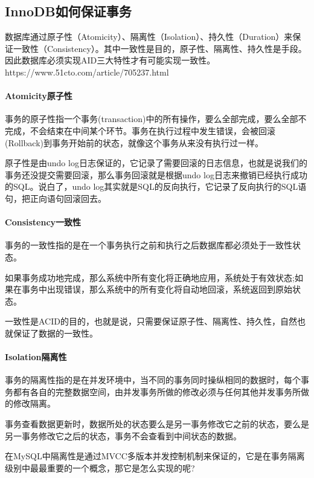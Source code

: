 \documentclass[../../../interview-questions.tex]{subfiles}
\begin{document}
\subsection{InnoDB如何保证事务}

数据库通过原子性（Atomicity）、隔离性（Isolation）、持久性（Duration）来保证一致性（Consistency）。其中一致性是目的，原子性、隔离性、持久性是手段。因此数据库必须实现AID三大特性才有可能实现一致性。https://www.51cto.com/article/705237.html

\paragraph{Atomicity原子性}

事务的原子性指一个事务(transaction)中的所有操作，要么全部完成，要么全部不完成，不会结束在中间某个环节。事务在执行过程中发生错误，会被回滚(Rollback)到事务开始前的状态，就像这个事务从来没有执行过一样。

原子性是由undo log日志保证的，它记录了需要回滚的日志信息，也就是说我们的事务还没提交需要回滚，那么事务回滚就是根据undo log日志来撤销已经执行成功的SQL。说白了，undo log其实就是SQL的反向执行，它记录了反向执行的SQL语句，把正向语句回滚回去。

\paragraph{Consistency一致性}

事务的一致性指的是在一个事务执行之前和执行之后数据库都必须处于一致性状态。

如果事务成功地完成，那么系统中所有变化将正确地应用，系统处于有效状态;如果在事务中出现错误，那么系统中的所有变化将自动地回滚，系统返回到原始状态。

一致性是ACID的目的，也就是说，只需要保证原子性、隔离性、持久性，自然也就保证了数据的一致性。

\paragraph{Isolation隔离性}

事务的隔离性指的是在并发环境中，当不同的事务同时操纵相同的数据时，每个事务都有各自的完整数据空间，由并发事务所做的修改必须与任何其他并发事务所做的修改隔离。

事务查看数据更新时，数据所处的状态要么是另一事务修改它之前的状态，要么是另一事务修改它之后的状态，事务不会查看到中间状态的数据。

在MySQL中隔离性是通过MVCC多版本并发控制机制来保证的，它是在事务隔离级别中最最重要的一个概念，那它是怎么实现的呢?
\end{document}
